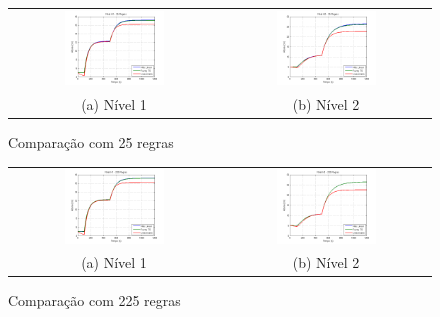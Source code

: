 \begin{figure}[H]
	\centering
	\begin{tabular}{cc}
		\includegraphics[width=0.5\textwidth,keepaspectratio]{img/h1_ts5.png} &
		\includegraphics[width=0.5\textwidth,keepaspectratio]{img/h2_ts5.png} \\
		(a) Nível 1 &
		(b) Nível 2
	\end{tabular}
	\caption{\label{imgTS5} Comparação com 25 regras}
\end{figure}

\begin{figure}[H]
	\centering
	\begin{tabular}{cc}
		\includegraphics[width=0.5\textwidth,keepaspectratio]{img/h1_ts15.png} &
		\includegraphics[width=0.5\textwidth,keepaspectratio]{img/h2_ts15.png} \\
		(a) Nível 1 &
		(b) Nível 2
	\end{tabular}
	\caption{\label{imgTS15} Comparação com 225 regras}
\end{figure}

